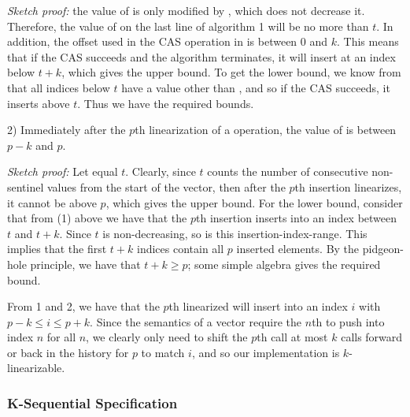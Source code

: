 \documentclass{sigplanconf}
\begin{document}
\textit{Sketch proof:} the value of  is only modified by , which does not decrease it. Therefore, the value of  on the last line of algorithm 1 will be no more than $t$. In addition, the offset used in the CAS operation in  is between 0 and $k$. This means that if the CAS succeeds and the algorithm terminates, it will insert at an index below $t + k$, which gives the upper bound. To get the lower bound, we know from  that all indices below $t$ have a value other than , and so if the CAS succeeds, it inserts above $t$. Thus we have the required bounds.

2) Immediately after the $p$th linearization of a  operation, the value of  is between $p-k$ and $p$. 

\textit{Sketch proof:} Let  equal $t$. Clearly, since $t$ counts the number of consecutive non-sentinel values from the start of the vector, then after the $p$th insertion linearizes, it cannot be above $p$, which gives the upper bound. For the lower bound, consider that from (1) above we have that the $p$th insertion inserts into an index between $t$ and $t + k$. Since $t$ is non-decreasing, so is this insertion-index-range. This implies that the first $t + k$ indices contain all $p$ inserted elements. By the pidgeon-hole principle, we have that $t + k \ge p$; some simple algebra gives the required bound. 

From 1 and 2, we have that the $p$th linearized  will insert into an index $i$ with $p - k \le i \le p + k$. Since the semantics of a vector require the $n$th  to push into index $n$ for all $n$, we clearly only need to shift the $p$th call at most $k$ calls forward or back in the history for $p$ to match $i$, and so our implementation is $k$-linearizable.

\subsubsection{K-Sequential Specification}
\end{document}
